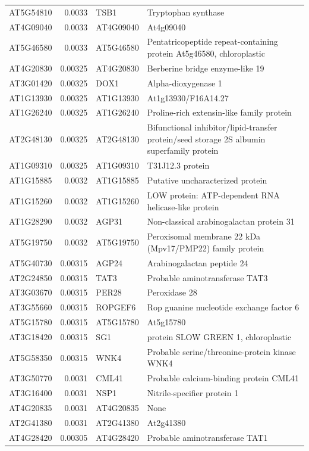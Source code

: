 \documentclass[11pt]{article}
\begin{document}
\begin{center}
\begin{tabular}{lrll}
AT5G54810 & 0.0033 & TSB1 & Tryptophan synthase\\
AT4G09040 & 0.0033 & AT4G09040 & At4g09040\\
AT5G46580 & 0.0033 & AT5G46580 & Pentatricopeptide repeat-containing protein At5g46580, chloroplastic\\
AT4G20830 & 0.00325 & AT4G20830 & Berberine bridge enzyme-like 19\\
AT3G01420 & 0.00325 & DOX1 & Alpha-dioxygenase 1\\
AT1G13930 & 0.00325 & AT1G13930 & At1g13930/F16A14.27\\
AT1G26240 & 0.00325 & AT1G26240 & Proline-rich extensin-like family protein\\
AT2G48130 & 0.00325 & AT2G48130 & Bifunctional inhibitor/lipid-transfer protein/seed storage 2S albumin superfamily protein\\
AT1G09310 & 0.00325 & AT1G09310 & T31J12.3 protein\\
AT1G15885 & 0.0032 & AT1G15885 & Putative uncharacterized protein\\
AT1G15260 & 0.0032 & AT1G15260 & LOW protein: ATP-dependent RNA helicase-like protein\\
AT1G28290 & 0.0032 & AGP31 & Non-classical arabinogalactan protein 31\\
AT5G19750 & 0.0032 & AT5G19750 & Peroxisomal membrane 22 kDa (Mpv17/PMP22) family protein\\
AT5G40730 & 0.00315 & AGP24 & Arabinogalactan peptide 24\\
AT2G24850 & 0.00315 & TAT3 & Probable aminotransferase TAT3\\
AT3G03670 & 0.00315 & PER28 & Peroxidase 28\\
AT3G55660 & 0.00315 & ROPGEF6 & Rop guanine nucleotide exchange factor 6\\
AT5G15780 & 0.00315 & AT5G15780 & At5g15780\\
AT3G18420 & 0.00315 & SG1 & protein SLOW GREEN 1, chloroplastic\\
AT5G58350 & 0.00315 & WNK4 & Probable serine/threonine-protein kinase WNK4\\
AT3G50770 & 0.0031 & CML41 & Probable calcium-binding protein CML41\\
AT3G16400 & 0.0031 & NSP1 & Nitrile-specifier protein 1\\
AT4G20835 & 0.0031 & AT4G20835 & None\\
AT2G41380 & 0.0031 & AT2G41380 & At2g41380\\
AT4G28420 & 0.00305 & AT4G28420 & Probable aminotransferase TAT1\\

\end{tabular}
\end{center}
\end{document}
